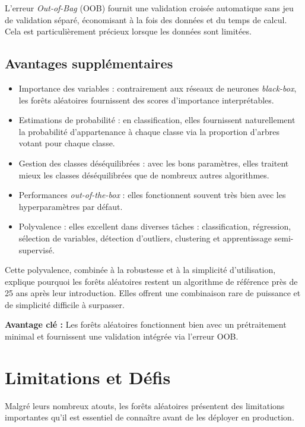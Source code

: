 L’erreur \emph{Out-of-Bag} (OOB) fournit une validation croisée automatique sans jeu de validation séparé, économisant à la fois des données et du temps de calcul. Cela est particulièrement précieux lorsque les données sont limitées.

\subsection{Avantages supplémentaires}

\begin{itemize}
    \item Importance des variables : contrairement aux réseaux de neurones \emph{black-box}, les forêts aléatoires fournissent des scores d’importance interprétables.
    \item Estimations de probabilité : en classification, elles fournissent naturellement la probabilité d’appartenance à chaque classe via la proportion d’arbres votant pour chaque classe.
    \item Gestion des classes déséquilibrées : avec les bons paramètres, elles traitent mieux les classes déséquilibrées que de nombreux autres algorithmes.
    \item Performances \emph{out-of-the-box} : elles fonctionnent souvent très bien avec les hyperparamètres par défaut.
    \item Polyvalence : elles excellent dans diverses tâches : classification, régression, sélection de variables, détection d’outliers, clustering et apprentissage semi-supervisé.
\end{itemize}

Cette polyvalence, combinée à la robustesse et à la simplicité d’utilisation, explique pourquoi les forêts aléatoires restent un algorithme de référence près de 25 ans après leur introduction. Elles offrent une combinaison rare de puissance et de simplicité difficile à surpasser.

\medskip
\noindent
\textbf{Avantage clé :} Les forêts aléatoires fonctionnent bien avec un prétraitement minimal et fournissent une validation intégrée via l’erreur OOB.
\section{Limitations et Défis}

Malgré leurs nombreux atouts, les forêts aléatoires présentent des limitations importantes qu’il est essentiel de connaître avant de les déployer en production.

